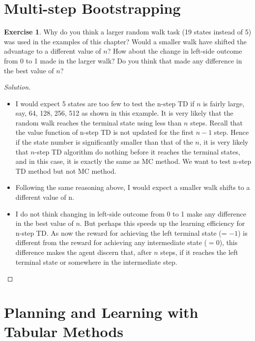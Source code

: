 \documentclass[oneside,11pt]{article}
\theoremstyle{definition}
\newtheorem{exer}[thm]{Exercise}
\newenvironment{solution}
{\renewcommand\qedsymbol{$\blacksquare$}\begin{proof}[Solution]} {\end{proof}}
\begin{document}
\section{Multi-step Bootstrapping}

\begin{exer}
Why do you think a larger random walk task (19 states instead of 5) was used in the examples of this chapter? Would a smaller walk have shifted the advantage to a different value of $n$? How about the change in left-side outcome from 0 to 1 made in the larger walk? Do you think that made any difference in the best value of $n$?
\end{exer}


\begin{shaded}
\begin{solution}
~\\
\begin{itemize} 
 \item I would expect 5 states are too few to test the n-step TD if $n$ is fairly large, say, 64, 128, 256, 512 as shown in this example. It is very likely that the random walk reaches the terminal state using less than $n$ steps. Recall that the value function of n-step TD is not updated for the first $n-1$ step. Hence if the state number is significantly smaller than that of the $n$, it is very likely that $n$-step TD algorithm do nothing before it reaches the terminal states, and in this case, it is exactly the same as MC method. We want to test n-step TD method but not MC method.
 
 \item Following the same reasoning above, I would expect a smaller walk shifts to a different value of n. 

 \item I do not think changing in left-side outcome from 0 to 1 make any difference in the best value of $n$. But perhaps this speeds up the learning efficiency for n-step TD. As now the reward for achieving the left terminal state (= $-1$) is different from the reward for achieving any intermediate state ($= 0$), this difference makes the agent discern that, after $n$ steps, if it reaches the left terminal state or somewhere in the intermediate step.
 
 \end{itemize}

\end{solution} 
\end{shaded}

\section{Planning and Learning with Tabular Methods}
\end{document}
